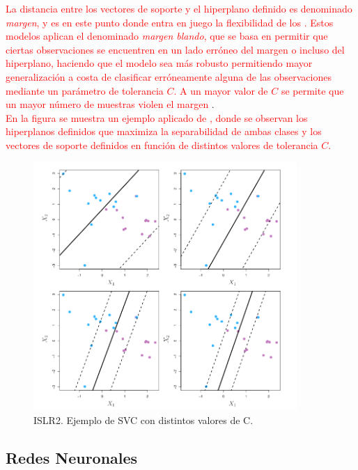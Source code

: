             \textcolor{red}{La distancia entre los vectores de soporte y el hiperplano definido es denominado \textit{margen}, y es en este punto donde entra en juego la flexibilidad de los . Estos modelos aplican el denominado \textit{margen blando}, que se basa en permitir que ciertas observaciones se encuentren en un lado erróneo del margen o incluso del hiperplano, haciendo que el modelo sea más robusto permitiendo mayor generalización a costa de clasificar erróneamente alguna de las observaciones mediante un parámetro de tolerancia $C$. A un mayor valor de $C$ se permite que un mayor número de muestras violen el margen \citep{ISLR2}}.\\


            \textcolor{red}{En la figura \cite{SVCExampleImage} se muestra un ejemplo aplicado de , donde se observan los hiperplanos definidos que maximiza la separabilidad de ambas clases y los vectores de soporte definidos en función de distintos valores de tolerancia $C$.}

            \begin{figure}[h]
                \centering
                \includegraphics[width=10cm]{archivos/3.Tecnologias/SVC/SVCExample}
                \caption{ISLR2. Ejemplo de SVC con distintos valores de C.}
                \label{SVCExampleImage}
             \end{figure}

        \subsection {Redes Neuronales}

